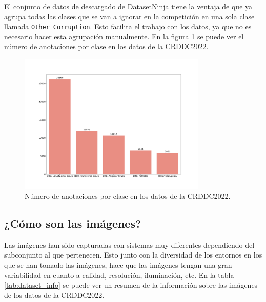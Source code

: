 El conjunto de datos de descargado de DatasetNinja tiene la ventaja de que ya agrupa todas las clases que se van a ignorar en la competición en una sola clase llamada \texttt{Other Corruption}. Esto facilita el trabajo con los datos, ya que no es necesario hacer esta agrupación manualmente. En la figura \ref{fig:datasetNinja_class_count_bar} se puede ver el número de anotaciones por clase en los datos de la CRDDC2022.

\begin{figure}[H]
    \centering
    \includegraphics[width=0.8\textwidth]{graphs/datasetNinja_class_count_bar.png}
    \caption{Número de anotaciones por clase en los datos de la CRDDC2022.}
    \label{fig:datasetNinja_class_count_bar}
\end{figure}


\subsection{¿Cómo son las imágenes?}
Las imágenes han sido capturadas con sistemas muy diferentes dependiendo del subconjunto al que pertenecen. Esto junto con la diversidad de los entornos en los que se han tomado las imágenes, hace que las imágenes tengan una gran variabilidad en cuanto a calidad, resolución, iluminación, etc. En la tabla \ref{tab:dataset_info} se puede ver un resumen de la información sobre las imágenes de los datos de la CRDDC2022.

